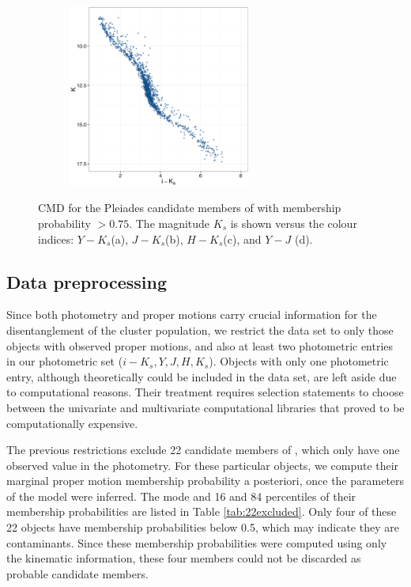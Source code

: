 \begin{figure}[ht!]
\begin{subfigure}[t]{0.45\textwidth}
    \end{subfigure}
     \begin{subfigure}[t]{0.45\textwidth}
      \includegraphics[page=5,height=6cm]{background/Figures/CIs.pdf}
        \caption{}
         
    \end{subfigure}
    \caption{CMD for the Pleiades candidate members of \citet{Bouy2015}  with membership probability $>0.75$. The magnitude $K_s$ is shown versus the colour indices: $Y-K_s$(a), $J-K_s$(b), $H-K_s$(c), and $Y-J$ (d).}
    \label{fig:otherCI}
\end{figure}


\subsection{Data preprocessing}
\label{sect:RDR2}
Since both photometry and proper motions carry crucial information for the disentanglement of the cluster population, we restrict the data set to only those objects with observed proper motions, and also at least two photometric entries in our photometric set ($i-K_s,Y,J,H,K_s$). {Objects with only one photometric entry, although theoretically could be included in the data set, are left aside due to computational reasons. Their treatment requires selection statements to choose between the univariate and multivariate computational libraries that proved to be computationally expensive.}

The previous restrictions exclude 22 candidate members of \citet{Bouy2015}, which only have one observed value in the photometry. For these particular objects, we compute their marginal proper motion membership probability a posteriori, once the parameters of the model were inferred. The mode and 16 and 84 percentiles of their membership probabilities are listed in Table \ref{tab:22excluded}. Only four of these 22 objects have membership probabilities below 0.5, which may indicate they are contaminants. Since these membership probabilities were computed using only the kinematic information, these four members could not be discarded as probable candidate members.

